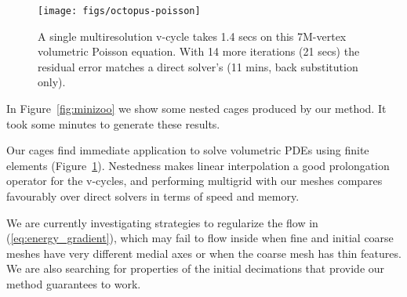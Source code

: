 \documentclass{cgyrf15}
\begin{document}
\begin{figure}[t]
  \texttt{[image: figs/octopus-poisson]}
  \caption{A single multiresolution v-cycle takes 1.4 secs on this 7M-vertex
  volumetric Poisson equation. With 14 more iterations (21 secs) the residual
  error matches a direct solver's (11 mins, back substitution only).}
  \label{fig:octopus}
\end{figure}

In Figure~\ref{fig:minizoo} we show some nested cages produced by our method.
It took some
minutes to generate these results. 

Our cages find immediate application to solve volumetric PDEs using finite
elements (Figure~\ref{fig:octopus}). Nestedness makes linear interpolation a
good prolongation operator for the v-cycles, and performing multigrid with our
meshes compares favourably over direct solvers in terms of speed and memory.


We are currently investigating strategies to regularize the flow in
(\ref{eq:energy_gradient}), which may fail to flow inside when fine and initial
coarse meshes have very different medial axes or when the coarse mesh has thin
features. We are also searching for properties of the initial decimations that
provide our method guarantees to work. 



 
\end{document}
